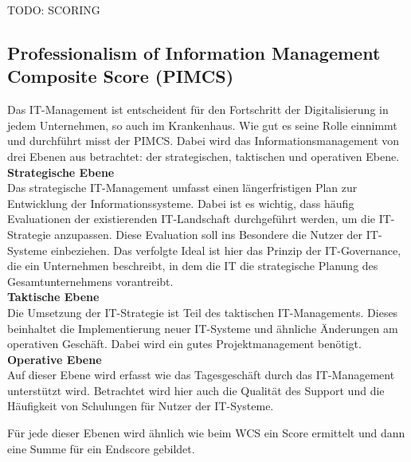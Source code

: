 	TODO: SCORING
\subsection{Professionalism of Information Management Composite Score (PIMCS)}
	Das IT-Management ist entscheident für den Fortschritt der Digitalisierung in jedem Unternehmen, so auch im Krankenhaus. Wie gut es seine Rolle einnimmt und durchführt misst der PIMCS. Dabei wird das Informationsmanagement von drei Ebenen aus betrachtet: der strategischen, taktischen und operativen Ebene. \parencite{huebner2019}
	\vspace{\parheadvspace}\\
	\textbf{Strategische Ebene}\\
	Das strategische IT-Management umfasst einen längerfristigen Plan zur Entwicklung der Informationssysteme. Dabei ist es wichtig, dass häufig Evaluationen der existierenden IT-Landschaft durchgeführt werden, um die IT-Strategie anzupassen. Diese Evaluation soll ins Besondere die Nutzer der IT-Systeme einbeziehen. Das verfolgte Ideal ist hier das Prinzip der IT-Governance, die ein Unternehmen beschreibt, in dem die IT die strategische Planung des Gesamtunternehmens vorantreibt.
	\vspace{\parheadvspace}\\
	\textbf{Taktische Ebene}\\
	Die Umsetzung der IT-Strategie ist Teil des taktischen IT-Managements. Dieses beinhaltet die Implementierung neuer IT-Systeme und ähnliche Änderungen am operativen Geschäft. Dabei wird ein gutes Projektmanagement benötigt.
	\vspace{\parheadvspace}\\
	\textbf{Operative Ebene}\\
	Auf dieser Ebene wird erfasst wie das Tagesgeschäft durch das IT-Management unterstützt wird. Betrachtet wird hier auch die Qualität des Support und die Häufigkeit von Schulungen für Nutzer der IT-Systeme.

	Für jede dieser Ebenen wird ähnlich wie beim WCS ein Score ermittelt und dann eine Summe für ein Endscore gebildet. \parencite{huebner2019}
